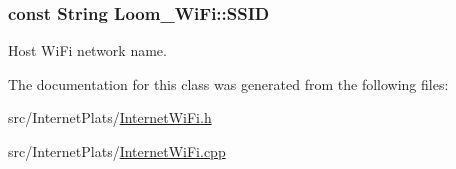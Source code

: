 \subsubsection[{\texorpdfstring{S\+S\+ID}{SSID}}]{\setlength{\rightskip}{0pt plus 5cm}const String Loom\+\_\+\+Wi\+Fi\+::\+S\+S\+ID\hspace{0.3cm}{\ttfamily [protected]}}\hypertarget{class_loom___wi_fi_a79239f0be6d0094eef2b2e47cac5e252}{}\label{class_loom___wi_fi_a79239f0be6d0094eef2b2e47cac5e252}


Host Wi\+Fi network name. 



The documentation for this class was generated from the following files\+:\begin{DoxyCompactItemize}
\item 
src/\+Internet\+Plats/\hyperlink{_internet_wi_fi_8h}{Internet\+Wi\+Fi.\+h}\item 
src/\+Internet\+Plats/\hyperlink{_internet_wi_fi_8cpp}{Internet\+Wi\+Fi.\+cpp}\end{DoxyCompactItemize}
